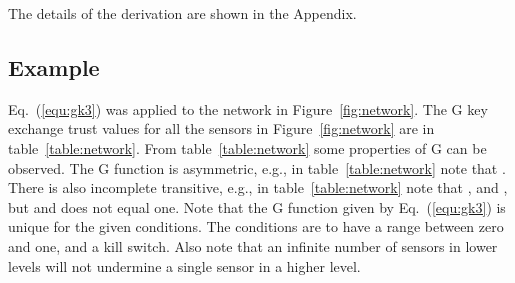 \documentclass{ws-fnl2}
\begin{document}
\noindent The details of the derivation are shown in the Appendix.


\subsection{Example}

Eq.~(\ref{equ:gk3}) was applied to the network in Figure~\ref{fig:network}. The G key exchange trust values for all the sensors in Figure~\ref{fig:network} are in table~\ref{table:network}. From table~\ref{table:network} some properties of G can be observed. The G function is asymmetric, e.g., in table~\ref{table:network} note that . There is also incomplete transitive, e.g., in table~\ref{table:network} note that , and , but  and does not equal one. Note that the G function given by Eq.~(\ref{equ:gk3}) is unique for the given conditions. The conditions are to have a range between zero and one, and a kill switch. Also note that an infinite number of sensors in lower levels will not undermine a single sensor in a higher level.
\end{document}
